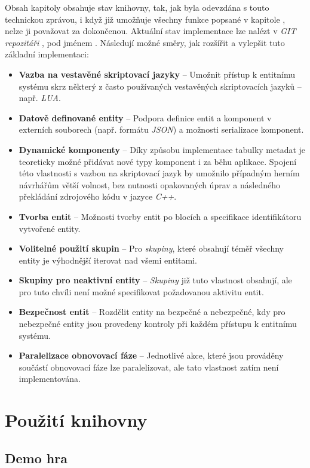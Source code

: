 Obsah kapitoly  obsahuje stav knihovny, tak, jak byla odevzdána s touto technickou zprávou, i když již umožňuje všechny funkce popsané v kapitole , nelze ji považovat za dokončenou. Aktuální stav implementace lze nalézt v \emph{GIT repozitáři} \cite{EntropyGit}, pod jménem . Následují možné směry, jak rozšířit a vylepšit tuto základní implementaci: 

\begin{itemize}
	\item \textbf{Vazba na vestavěné skriptovací jazyky} -- Umožnit přístup k entitnímu systému skrz některý z často používaných vestavěných skriptovacích jazyků -- např. \emph{LUA}. 
	\item \textbf{Datově definované entity} -- Podpora definice entit a komponent v externích souborech (např. formátu \emph{JSON}) a možnosti serializace komponent.
	\item \textbf{Dynamické komponenty} -- Díky způsobu implementace tabulky metadat je teoreticky možné přidávat nové typy komponent i za běhu aplikace. Spojení této vlastnosti s vazbou na skriptovací jazyk by umožnilo případným herním návrhářům větší volnost, bez nutnosti opakovaných úprav a následného překládání zdrojového kódu v jazyce \emph{C++}.
	\item \textbf{Tvorba entit} -- Možnosti tvorby entit po blocích a specifikace identifikátoru vytvořené entity.
	\item \textbf{Volitelné použití skupin} -- Pro \emph{skupiny}, které obsahují téměř všechny entity je výhodnější iterovat nad všemi entitami. 
	\item \textbf{Skupiny pro neaktivní entity} -- \emph{Skupiny} již tuto vlastnost obsahují, ale pro tuto chvíli není možné specifikovat požadovanou aktivitu entit.
	\item \textbf{Bezpečnost entit} -- Rozdělit entity na bezpečné a nebezpečné, kdy pro nebezpečné entity jsou provedeny kontroly při každém přístupu k entitnímu systému.
	\item \textbf{Paralelizace obnovovací fáze} -- Jednotlivé akce, které jsou prováděny součástí obnovovací fáze lze paralelizovat, ale tato vlastnost zatím není implementována.
\end{itemize}

\chapter{Použití knihovny}

\section{Demo hra}
\blind[1]

